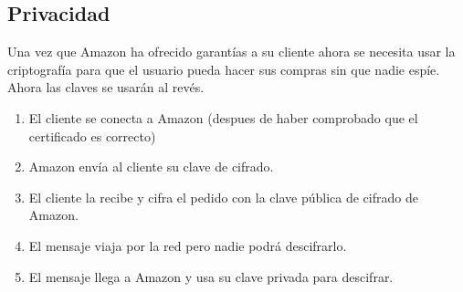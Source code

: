 \documentclass[letterpaper,10pt,spanish]{sphinxmanual}
\begin{document}
\subsection{Privacidad}
\label{\detokenize{tema_pautas_seguridad_informatica/tema_pautas_seguridad_informatica:privacidad}}
Una vez que Amazon ha ofrecido garantías a su cliente ahora se necesita usar la criptografía para que el usuario pueda hacer sus compras sin que nadie espíe. Ahora las claves se usarán al revés.
\begin{enumerate}
%
\item {} 
El cliente se conecta a Amazon (despues de haber comprobado que el certificado es correcto)

\item {} 
Amazon envía al cliente su clave de cifrado.

\item {} 
El cliente la recibe y cifra el pedido con la clave pública de cifrado de Amazon.

\item {} 
El mensaje viaja por la red pero nadie podrá descifrarlo.

\item {} 
El mensaje llega a Amazon y usa su clave privada para descifrar.

\end{enumerate}
\end{document}
